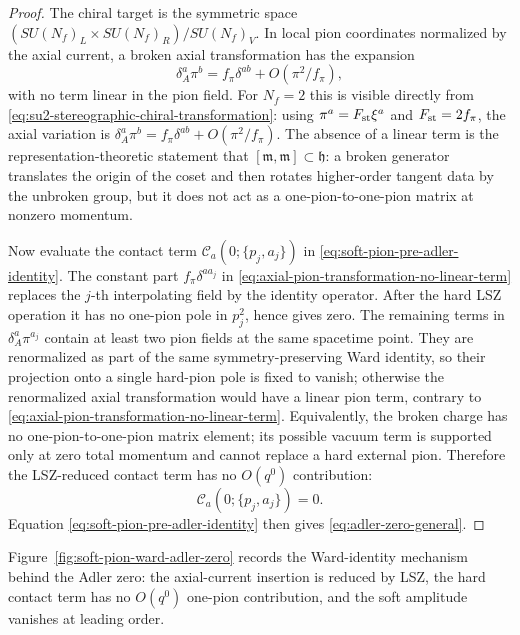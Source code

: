 \begin{proof}
The chiral target is the symmetric space
\((SU(N_f)_L\times SU(N_f)_R)/SU(N_f)_V\).  In local pion coordinates normalized
by the axial current, a broken axial transformation has the expansion
\begin{equation}
  \delta_A^a\pi^b
  =
  f_\pi\delta^{ab}
  +O(\pi^2/f_\pi),
  \label{eq:axial-pion-transformation-no-linear-term}
\end{equation}
with no term linear in the pion field.  For \(N_f=2\) this is visible directly
from \eqref{eq:su2-stereographic-chiral-transformation}: using
\(\pi^a=F_{\rm st}\xi^a\) and \(F_{\rm st}=2f_\pi\), the axial variation is
\(\delta_A^a\pi^b=f_\pi\delta^{ab}+O(\pi^2/f_\pi)\).  The absence of a linear
term is the representation-theoretic statement that
\([\mathfrak m,\mathfrak m]\subset\mathfrak h\): a broken generator translates
the origin of the coset and then rotates higher-order tangent data by the
unbroken group, but it does not act as a one-pion-to-one-pion matrix at
nonzero momentum.

Now evaluate the contact term
\(\mathcal C_a(0;\{p_j,a_j\})\) in
\eqref{eq:soft-pion-pre-adler-identity}.  The constant part
\(f_\pi\delta^{aa_j}\) in \eqref{eq:axial-pion-transformation-no-linear-term}
replaces the \(j\)-th interpolating field by the identity operator.  After the
hard LSZ operation it has no one-pion pole in \(p_j^2\), hence gives zero.
The remaining terms in \(\delta_A^a\pi^{a_j}\) contain at least two pion
fields at the same spacetime point.  They are renormalized as part of the same
symmetry-preserving Ward identity, so their projection onto a single hard-pion
pole is fixed to vanish; otherwise the renormalized axial transformation would
have a linear pion term, contrary to
\eqref{eq:axial-pion-transformation-no-linear-term}.  Equivalently, the broken
charge has no one-pion-to-one-pion matrix element; its possible vacuum term is
supported only at zero total momentum and cannot replace a hard external pion.
Therefore the LSZ-reduced contact term has no \(O(q^0)\) contribution:
\[
  \mathcal C_a(0;\{p_j,a_j\})=0 .
\]
Equation \eqref{eq:soft-pion-pre-adler-identity} then gives
\eqref{eq:adler-zero-general}.
\end{proof}

Figure~\ref{fig:soft-pion-ward-adler-zero} records the Ward-identity mechanism
behind the Adler zero: the axial-current insertion is reduced by LSZ, the hard
contact term has no \(O(q^0)\) one-pion contribution, and the soft amplitude
vanishes at leading order.

